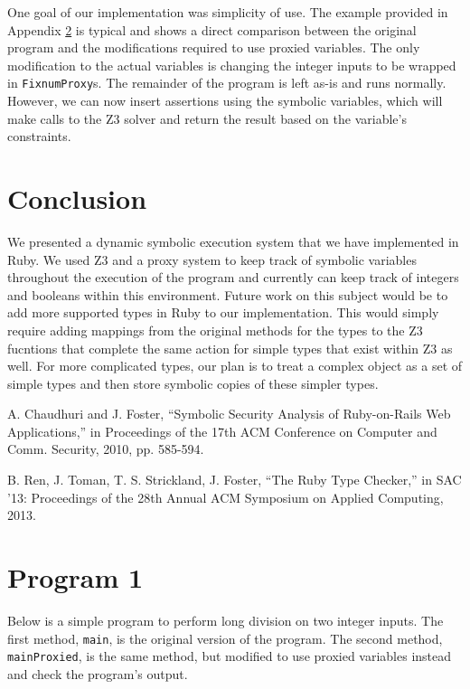 \documentclass[10pt]{article}
\begin{document}
One goal of our implementation was simplicity of use.  The example provided in Appendix \ref{appdx1} is typical and shows a direct comparison between the original program and the modifications required to use proxied variables.  The only modification to the actual variables is changing the integer inputs to be wrapped in \texttt{FixnumProxy}s.  The remainder of the program is left as-is and runs normally.  However, we can now insert assertions using the symbolic variables, which will make calls to the Z3 solver and return the result based on the variable's constraints.

\section{Conclusion}
We presented a dynamic symbolic execution system  that we have implemented in Ruby.  We used Z3 and a proxy system to keep track of symbolic variables throughout the execution of the program and currently can keep track of integers and booleans within this environment.  Future work on this subject would be to add more supported types in Ruby to our implementation.  This would simply require adding mappings from the original methods for the types to the Z3 fucntions that complete the same action for simple types that exist within Z3 as well.  For more complicated types, our plan is to treat a complex object as a set of simple types and then store symbolic copies of these simpler types.\\

\begin{thebibliography}{99}
A. Chaudhuri and J. Foster, ``Symbolic Security Analysis of Ruby-on-Rails Web Applications,'' in Proceedings of the 17th ACM Conference on Computer and Comm. Security, 2010, pp. 585-594.

B. Ren, J. Toman, T. S. Strickland, J. Foster, ``The Ruby Type Checker,'' in SAC '13: Proceedings of the 28th Annual ACM Symposium on Applied Computing, 2013.

\end{thebibliography}

\newpage
\appendix
\section{Program 1}
\label{appdx1}
Below is a simple program to perform long division on two integer inputs.  The first method, \texttt{main}, is the original version of the program.  The second method, \texttt{mainProxied}, is the same method, but modified to use proxied variables instead and check the program's output.\\
\end{document}
